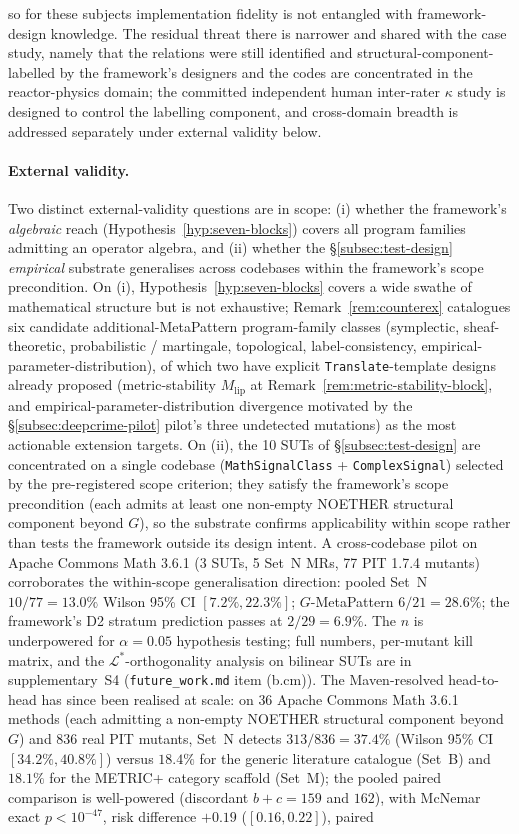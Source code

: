 \documentclass[acmsmall,screen,review]{acmart}
\begin{document}
so for these subjects implementation fidelity is not entangled with framework-design knowledge. The residual threat there is narrower and shared with the case study, namely that the relations were still identified and structural-component-labelled by the framework's designers and the codes are concentrated in the reactor-physics domain; the committed independent human inter-rater $\kappa$ study is designed to control the labelling component, and cross-domain breadth is addressed separately under external validity below.

\paragraph{External validity.} Two distinct external-validity questions are in scope: (i) whether the framework's \emph{algebraic} reach (Hypothesis~\ref{hyp:seven-blocks}) covers all program families admitting an operator algebra, and (ii) whether the \S\ref{subsec:test-design} \emph{empirical} substrate generalises across codebases within the framework's scope precondition. On (i), Hypothesis~\ref{hyp:seven-blocks} covers a wide swathe of mathematical structure but is not exhaustive; Remark~\ref{rem:counterex} catalogues six candidate additional-MetaPattern program-family classes (symplectic, sheaf-theoretic, probabilistic / martingale, topological, label-consistency, empirical-parameter-distribution), of which two have explicit \texttt{Translate}-template designs already proposed (metric-stability $M_{\mathrm{lip}}$ at Remark~\ref{rem:metric-stability-block}, and empirical-parameter-distribution divergence motivated by the \S\ref{subsec:deepcrime-pilot} pilot's three undetected mutations) as the most actionable extension targets. On (ii), the 10 SUTs of \S\ref{subsec:test-design} are concentrated on a single codebase (\texttt{MathSignalClass} + \texttt{ComplexSignal}) selected by the pre-registered scope criterion; they satisfy the framework's scope precondition (each admits at least one non-empty NOETHER structural component beyond $G$), so the substrate confirms applicability within scope rather than tests the framework outside its design intent. A cross-codebase pilot on Apache Commons Math 3.6.1 (3 SUTs, 5 Set~N MRs, 77 PIT 1.7.4 mutants) corroborates the within-scope generalisation direction: pooled Set~N $10/77 = 13.0\%$ Wilson 95\% CI $[7.2\%, 22.3\%]$; $G$-MetaPattern $6/21 = 28.6\%$; the framework's D2 stratum prediction passes at $2/29 = 6.9\%$. The $n$ is underpowered for $\alpha = 0.05$ hypothesis testing; full numbers, per-mutant kill matrix, and the $\mathcal{L}^{*}$-orthogonality analysis on bilinear SUTs are in supplementary~S4 (\texttt{future\_work.md} item (b.cm)). The Maven-resolved head-to-head has since been realised at scale: on $36$ Apache Commons Math 3.6.1 methods (each admitting a non-empty NOETHER structural component beyond $G$) and $836$ real PIT mutants, Set~N detects $313/836 = 37.4\%$ (Wilson 95\% CI $[34.2\%, 40.8\%]$) versus $18.4\%$ for the generic literature catalogue (Set~B) and $18.1\%$ for the METRIC+ category scaffold (Set~M); the pooled paired comparison is well-powered (discordant $b + c = 159$ and $162$), with McNemar exact $p < 10^{-47}$, risk difference $+0.19$ ($[0.16, 0.22]$), paired 
\end{document}
